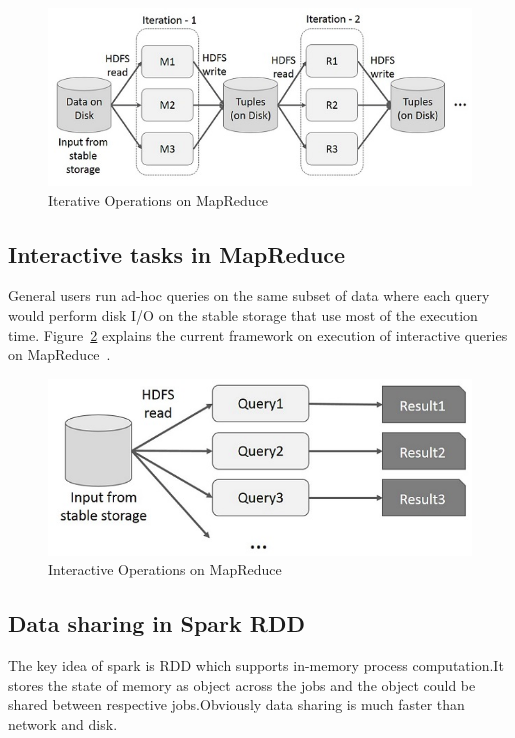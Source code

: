 \begin{figure}[!ht]
  \centering\includegraphics[width=\columnwidth]{images/iterative-MapReduce.png}
   \caption{Iterative Operations on MapReduce 
   ~\cite{hid-sp18-410-spark-RDD}}\label{fig:iterative-MapRed}
\end{figure}


\subsection{Interactive tasks in MapReduce}

General users run ad-hoc queries on the same subset of data where each query 
would perform disk I/O on the stable storage that use most of the execution 
time. Figure~\ref{fig:interactive-MapRed} explains the current framework on 
execution of interactive queries on MapReduce~\cite{hid-sp18-410-spark-RDD}.


\begin{figure}[!ht]
\centering\includegraphics[width=\columnwidth]{images/interactive-MapReduce.png}
   \caption{Interactive Operations on MapReduce
   ~\cite{hid-sp18-410-spark-RDD}}\label{fig:interactive-MapRed}
\end{figure}




\subsection{Data sharing in Spark RDD}
The key idea of spark is RDD which supports in-memory process computation.It 
stores the state of memory as object across the jobs and the object could be 
shared between respective jobs.Obviously data sharing is much faster than 
network and disk.


